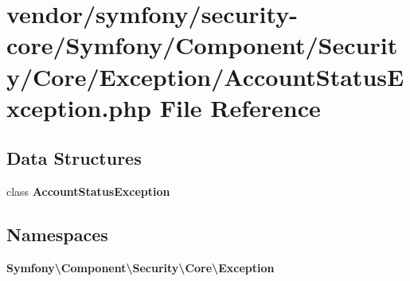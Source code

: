 \section{vendor/symfony/security-\/core/\+Symfony/\+Component/\+Security/\+Core/\+Exception/\+Account\+Status\+Exception.php File Reference}
\label{_account_status_exception_8php}
\subsection*{Data Structures}
\begin{DoxyCompactItemize}
\item 
class {\bf Account\+Status\+Exception}
\end{DoxyCompactItemize}
\subsection*{Namespaces}
\begin{DoxyCompactItemize}
\item 
 {\bf Symfony\textbackslash{}\+Component\textbackslash{}\+Security\textbackslash{}\+Core\textbackslash{}\+Exception}
\end{DoxyCompactItemize}

